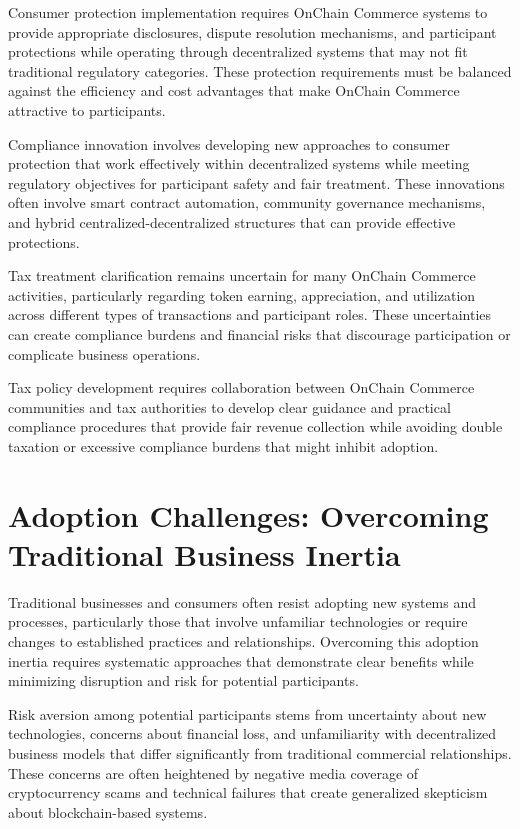 \documentclass[
  Letterpaper,
]{scrbook}
\begin{document}
Consumer protection implementation requires OnChain Commerce systems to
provide appropriate disclosures, dispute resolution mechanisms, and
participant protections while operating through decentralized systems
that may not fit traditional regulatory categories. These protection
requirements must be balanced against the efficiency and cost advantages
that make OnChain Commerce attractive to participants.

Compliance innovation involves developing new approaches to consumer
protection that work effectively within decentralized systems while
meeting regulatory objectives for participant safety and fair treatment.
These innovations often involve smart contract automation, community
governance mechanisms, and hybrid centralized-decentralized structures
that can provide effective protections.

Tax treatment clarification remains uncertain for many OnChain Commerce
activities, particularly regarding token earning, appreciation, and
utilization across different types of transactions and participant
roles. These uncertainties can create compliance burdens and financial
risks that discourage participation or complicate business operations.

Tax policy development requires collaboration between OnChain Commerce
communities and tax authorities to develop clear guidance and practical
compliance procedures that provide fair revenue collection while
avoiding double taxation or excessive compliance burdens that might
inhibit adoption.

\section{Adoption Challenges: Overcoming Traditional Business
Inertia}\label{adoption-challenges-overcoming-traditional-business-inertia}

Traditional businesses and consumers often resist adopting new systems
and processes, particularly those that involve unfamiliar technologies
or require changes to established practices and relationships.
Overcoming this adoption inertia requires systematic approaches that
demonstrate clear benefits while minimizing disruption and risk for
potential participants.

Risk aversion among potential participants stems from uncertainty about
new technologies, concerns about financial loss, and unfamiliarity with
decentralized business models that differ significantly from traditional
commercial relationships. These concerns are often heightened by
negative media coverage of cryptocurrency scams and technical failures
that create generalized skepticism about blockchain-based systems.
\end{document}
